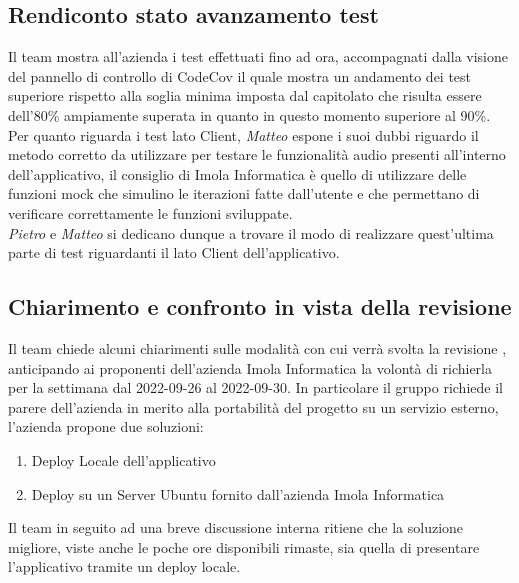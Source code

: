 \subsection{Rendiconto stato avanzamento test}
Il team mostra all'azienda i test effettuati fino ad ora, accompagnati dalla visione del pannello di controllo di CodeCov il quale mostra un andamento dei test 
superiore rispetto alla soglia minima imposta dal capitolato che risulta essere dell'80\% ampiamente superata in quanto in questo momento superiore al 90\%. 
\newline Per quanto riguarda i test lato Client, \textit{Matteo} espone i suoi dubbi riguardo il metodo corretto da utilizzare per testare le funzionalità audio
 presenti all'interno dell'applicativo, il consiglio di Imola Informatica è quello di utilizzare delle funzioni mock che simulino le iterazioni fatte dall'utente
  e che permettano di verificare correttamente le funzioni sviluppate. \\
\textit{Pietro} e \textit{Matteo} si dedicano dunque a trovare il modo di realizzare quest'ultima parte di test riguardanti il lato Client dell'applicativo.  

\subsection{Chiarimento e confronto in vista della revisione }
Il team chiede alcuni chiarimenti sulle modalità con cui verrà svolta la revisione , anticipando ai proponenti dell'azienda Imola Informatica la volontà di richierla per la settimana dal 2022-09-26 al 2022-09-30. 
\newline 
In particolare il gruppo richiede il parere dell'azienda in merito alla portabilità del progetto su un servizio esterno, l'azienda propone due soluzioni:
\begin{enumerate}
    \item Deploy Locale dell'applicativo
    \item Deploy su un Server Ubuntu fornito dall'azienda Imola Informatica 
\end{enumerate}
Il team in seguito ad una breve discussione interna ritiene che la soluzione migliore, viste anche le poche ore disponibili rimaste, sia quella di presentare l'applicativo tramite un deploy locale. 